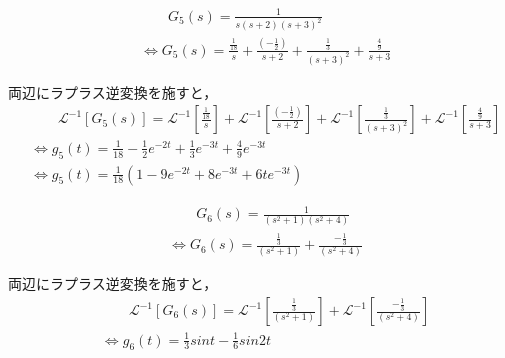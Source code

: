 \documentclass[a4paper,12pt]{article}
\begin{document}
\begin{tcolorbox}[title={1. (5) \( G_5(s)=\dfrac{ 1 }{ s ( s + 2 ) ( s + 3 )^2 } \) }]
    \vspace{-3mm}
  \begin{align*}
      &\qquad G_5(s) =\frac{ 1 }{ s ( s + 2 ) ( s + 3 )^2 }  \\
      &\Leftrightarrow G_5(s) 
      = \frac{\frac{1}{18}}{s}
      + \frac{(-\frac{1}{2})}{s + 2} 
      + \frac{\frac{1}{3}}{(s + 3)^2} 
      + \frac{\frac{4}{9}}{s + 3} 
  \end{align*}
  
  \quad 両辺にラプラス逆変換を施すと，
  \vspace{-3mm}
  \begin{align*}
      &\qquad \mathcal{L}^{-1} \left[ G_5(s) \right] 
      =\mathcal{L}^{-1} \left[ \frac{\frac{1}{18}}{s} \right]
      + \mathcal{L}^{-1} \left[ \frac{(-\frac{1}{2})}{s + 2} \right]
      + \mathcal{L}^{-1} \left[ \frac{\frac{1}{3}}{(s + 3)^2} \right]
      + \mathcal{L}^{-1} \left[ \frac{\frac{4}{9}}{s + 3} \right] \\
      &\Leftrightarrow g_5(t) = \frac{1}{18} - \frac{1}{2}e^{-2t} + \frac{1}{3}e^{-3t} +\frac{4}{9}e^{-3t}\\
      &\Leftrightarrow g_5(t) =\frac{1}{18} \left(1 - 9e^{-2t} + 8e^{-3t} +6te^{-3t} \right)
  \end{align*}
\end{tcolorbox}

\begin{tcolorbox}[title={1. (6) \( G_6(s)=\dfrac{ 1 }{ ( s^2 + 1 ) ( s^2 + 4 ) } \) }]
    \vspace{-3mm}
    \begin{align*}
      &\qquad G_6(s) =\frac{ 1 }{ ( s^2 + 1 ) ( s^2 + 4 ) } \\
      &\Leftrightarrow G_6(s) 
      = \frac{ \frac{1}{3} }{ ( s^2 + 1 ) }
      + \frac{ -\frac{1}{3} }{ ( s^2 + 4 ) }
  \end{align*}
  
  \quad 両辺にラプラス逆変換を施すと，
  \vspace{-3mm}
  \begin{align*}
      &\qquad \mathcal{L}^{-1} \left[ G_6(s) \right] 
      =\mathcal{L}^{-1} \left[ \frac{ \frac{1}{3} }{ ( s^2 + 1 ) } \right]
      +\mathcal{L}^{-1} \left[ \frac{- \frac{1}{3} }{ ( s^2 + 4 ) } \right] \\
      &\Leftrightarrow g_6(t) = \frac{1}{3}sin t -\frac{1}{6}sin 2t
  \end{align*}
  
\end{tcolorbox}
\newpage
\end{document}
